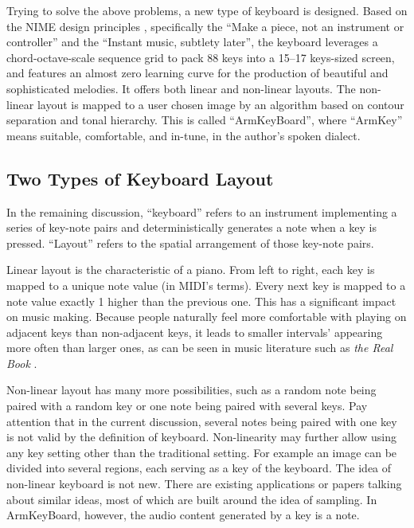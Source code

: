 Trying to solve the above problems, a new type of keyboard is designed. Based on the NIME design principles \cite{cook2001principles}, specifically the ``Make a piece, not an instrument or controller'' and the ``Instant music, subtlety later'', the keyboard leverages a chord-octave-scale sequence grid to pack 88 keys into a 15--17 keys-sized screen, and features an almost zero learning curve for the production of beautiful and sophisticated melodies. It offers both linear and non-linear layouts. The non-linear layout is mapped to a user chosen image by an algorithm based on contour separation and tonal hierarchy. This is called ``ArmKeyBoard'', where ``ArmKey'' means suitable, comfortable, and in-tune, in the author's spoken dialect.

\subsection{Two Types of Keyboard Layout}
In the remaining discussion, ``keyboard'' refers to an instrument implementing a series of key-note pairs and deterministically
generates a note when a key is pressed. ``Layout'' refers to the spatial arrangement of those key-note pairs.

Linear layout is the characteristic of a piano. From left to right, each key is mapped to a unique note value (in MIDI's terms). Every next key is mapped to
a note value exactly 1 higher than the previous one. This has a significant impact on music making. Because people naturally feel more comfortable with playing on adjacent keys than non-adjacent keys, it leads to smaller intervals' appearing more often than larger ones, as can be seen in music literature such as \textit{the Real Book} \cite{therealbook6th}.

Non-linear layout has many more possibilities, such as a random note being paired with a random key or one note being paired with several keys. Pay attention that in the current discussion, several notes being paired with one key is not valid by the definition of keyboard. Non-linearity may further allow using any key setting other than the traditional setting. For example an image can be divided into several regions, each serving as a key of the keyboard. The idea of non-linear keyboard is not new. There are existing applications \cite{kontakts} or papers \cite{kruge2011madpad} talking about similar ideas, most of which are built around the idea of sampling. In ArmKeyBoard, however, the audio content generated by a key is a note.

